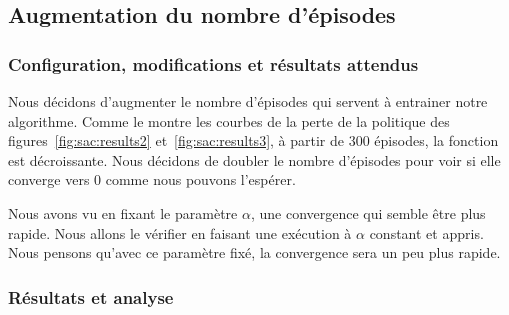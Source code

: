 \subsection{Augmentation du nombre d'épisodes}

\subsubsection{Configuration, modifications et résultats attendus}

Nous décidons d'augmenter le nombre d'épisodes qui servent à entrainer notre
algorithme. Comme le montre les courbes de la perte de la politique des
figures~\ref{fig:sac:results2} et~\ref{fig:sac:results3}, à partir de \(300\)
épisodes, la fonction est décroissante. Nous décidons de doubler le nombre
d'épisodes pour voir si elle converge vers \(0\) comme nous pouvons l'espérer.

Nous avons vu en fixant le paramètre \(\alpha\), une convergence qui semble être
plus rapide. Nous allons le vérifier en faisant une exécution à \(\alpha\)
constant et appris. Nous pensons qu'avec ce paramètre fixé, la convergence sera
un peu plus rapide.

\subsubsection{Résultats et analyse}
